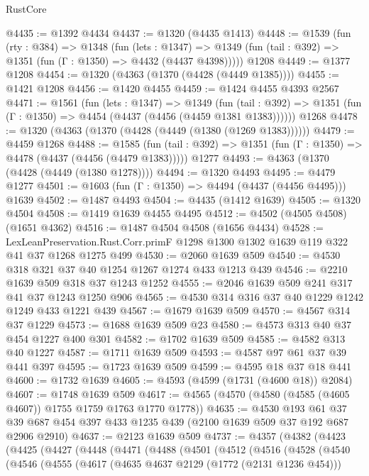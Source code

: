 \begin{lexlean}{RustCore}
\begin{coremodule}
@4435 := @1392 @4434
@4437 := @1320 (@4435 @1413)
@4448 := @1539
    (fun (rty : @384) =>
    @1348
      (fun (lets : @1347) =>
      @1349 (fun (tail : @392) => @1351 (fun (Γ : @1350) => @4432 (@4437 @4398)))))
    @1208
@4449 := @1377 @1208
@4454 := @1320 (@4363 (@1370 (@4428 (@4449 @1385))))
@4455 := @1421 @1208
@4456 := @1420 @4455
@4459 := @1424 @4455 @4393 @2567
@4471 := @1561
    (fun (lets : @1347) =>
    @1349
      (fun (tail : @392) => @1351 (fun (Γ : @1350) => @4454 (@4437 (@4456 (@4459 @1381 @1383))))))
    @1268
@4478 := @1320 (@4363 (@1370 (@4428 (@4449 (@1380 (@1269 @1383))))))
@4479 := @4459 @1268
@4488 := @1585
    (fun (tail : @392) => @1351 (fun (Γ : @1350) => @4478 (@4437 (@4456 (@4479 @1383)))))
    @1277
@4493 := @4363 (@1370 (@4428 (@4449 (@1380 @1278))))
@4494 := @1320 @4493
@4495 := @4479 @1277
@4501 := @1603 (fun (Γ : @1350) => @4494 (@4437 (@4456 @4495))) @1639
@4502 := @1487 @4493
@4504 := @4435 (@1412 @1639)
@4505 := @1320 @4504
@4508 := @1419 @1639 @4455 @4495
@4512 := @4502 (@4505 @4508) (@1651 @4362)
@4516 := @1487 @4504 @4508 (@1656 @4434)
@4528 := LexLeanPreservation.Rust.Corr.primF
    @1298
    @1300
    @1302
    @1639
    @119
    @322
    @41
    @37
    @1268
    @1275
    @499
@4530 := @2060 @1639 @509
@4540 := @4530 @318 @321 @37 @40 @1254 @1267 @1274 @433 @1213 @439
@4546 := @2210 @1639 @509 @318 @37 @1243 @1252
@4555 := @2046 @1639 @509 @241 @317 @41 @37 @1243 @1250 @906
@4565 := @4530 @314 @316 @37 @40 @1229 @1242 @1249 @433 @1221 @439
@4567 := @1679 @1639 @509
@4570 := @4567 @314 @37 @1229
@4573 := @1688 @1639 @509 @23
@4580 := @4573 @313 @40 @37 @454 @1227 @400 @301
@4582 := @1702 @1639 @509
@4585 := @4582 @313 @40 @1227
@4587 := @1711 @1639 @509
@4593 := @4587 @97 @61 @37 @39 @441 @397
@4595 := @1723 @1639 @509
@4599 := @4595 @18 @37 @18 @441
@4600 := @1732 @1639
@4605 := @4593 (@4599 (@1731 (@4600 @18)) @2084)
@4607 := @1748 @1639 @509
@4617 := @4565 (@4570 (@4580 (@4585 (@4605 @4607)) @1755 @1759 @1763 @1770 @1778))
@4635 := @4530
    @193
    @61
    @37
    @39
    @687
    @454
    @397
    @433
    @1235
    @439
    (@2100 @1639 @509 @37 @192 @687 @2906 @2910)
@4637 := @2123 @1639 @509
@4737 := @4357
    (@4382
      (@4423
        (@4425
          (@4427
            (@4448
              (@4471
                (@4488
                  (@4501
                    (@4512
                      (@4516
                        (@4528
                          (@4540
                            (@4546
                              (@4555
                                (@4617
                                  (@4635 @4637 @2129 (@1772 (@2131 @1236 @454)))

\end{coremodule}
\end{lexlean}
